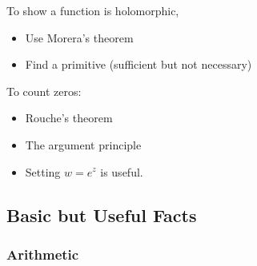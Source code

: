 \begin{fact}

To show a function is holomorphic,

\begin{itemize}
\tightlist
\item
  Use Morera's theorem
\item
  Find a primitive (sufficient but not necessary)
\end{itemize}

\end{fact}

\begin{fact}

To count zeros:

\begin{itemize}
\tightlist
\item
  Rouche's theorem
\item
  The argument principle
\end{itemize}

\end{fact}

\begin{itemize}
\tightlist
\item
  Setting \(w=e^z\) is useful.
\end{itemize}

\hypertarget{basic-but-useful-facts}{%
\subsection{Basic but Useful Facts}\label{basic-but-useful-facts}}

\hypertarget{arithmetic}{%
\subsubsection{Arithmetic}\label{arithmetic}}

